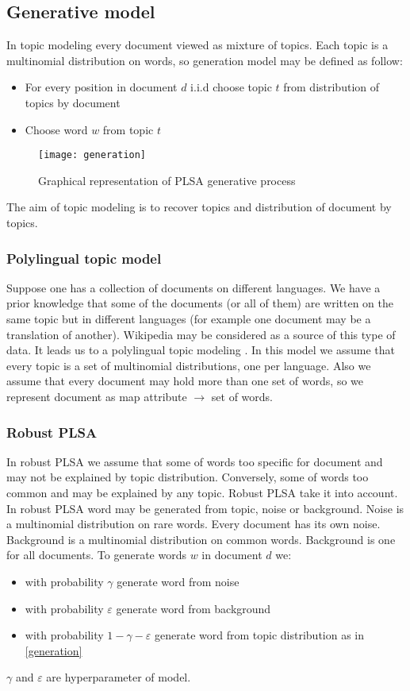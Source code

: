    \subsection{Generative model}
\label{generativeModel}
    In topic modeling every document viewed as mixture of topics. Each topic is a multinomial distribution on words,
    so generation model may be defined as follow:
    \begin{itemize} \label{generation}
	\item For every position in document $d$ i.i.d choose topic $t$ from distribution of topics by document
	\item Choose word $w$ from topic $t$
    \end{itemize}
    \begin{figure}[!ht]
	\caption{Graphical representation of PLSA generative process}
	\begin{minipage}{\textwidth}
	    \texttt{[image: generation]}
	\end{minipage}
    \end{figure}
    The aim of topic modeling is to recover topics and distribution of document by topics.
    \subsubsection{Polylingual topic model}
	Suppose one has a collection of documents on different languages. We have a prior knowledge that some of the
	documents (or all of them) are written on the same topic but in different languages (for example one document may be a translation of another).
	Wikipedia may be considered as a source of this type of data. It leads us to a polylingual topic modeling \cite{polylingual}.
	In this model we assume that every topic is a set of multinomial distributions, one per language. Also we assume that
	every document may hold more than one set of words, so we represent document as map attribute $\to$ set of words.

    \subsubsection{Robust PLSA}
	In robust PLSA we assume that some of words too specific for document and may not be explained by topic
	distribution. Conversely, some of words too common and may be explained by any topic.
	Robust PLSA take it into account. In robust PLSA word may be generated from topic, noise or background.
	Noise is a multinomial distribution on rare words. Every document has its own noise.
	Background is a multinomial distribution on common words. Background is one for all documents.
	To generate words $w$  in document $d$ we:
	\begin{itemize}
	    \item with probability $\gamma$ generate word from noise
	    \item with probability $\varepsilon$ generate word from background
	    \item with probability $1 - \gamma - \varepsilon$ generate word from topic
		distribution as in \ref{generation}
	\end{itemize}
	$\gamma$ and $\varepsilon$ are hyperparameter of model.


